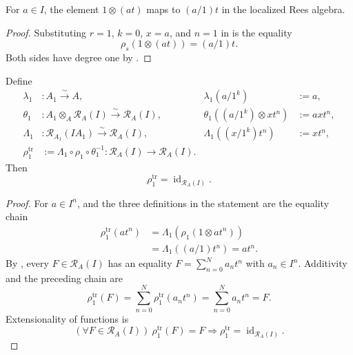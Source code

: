 \begin{lemma}
  \label{lemma:nagata-rees-localization-degree-one}

  For $a\in I$, the element $1\otimes(at)$ maps to $(a/1)t$ in the localized
  Rees algebra.
\end{lemma}

\begin{proof}
  Substituting $r=1$, $k=0$, $x=a$, and $n=1$ in
   is the equality
  \[
    \rho_s(1\otimes(at))=(a/1)t.
  \]
  Both sides have degree one by
  .
\end{proof}

\begin{lemma}
  \label{lemma:nagata-rees-localization-one}

  Define
  \[
  \begin{aligned}
    \lambda_1&\colon A_1\xrightarrow{\sim}A,
      &\lambda_1(a/1^k)&:=a,\\
    \theta_1&\colon A_1\otimes_A\mathcal R_A(I)
        \xrightarrow{\sim}\mathcal R_A(I),
      &\theta_1((a/1^k)\otimes xt^n)&:=axt^n,\\
    \Lambda_1&\colon\mathcal R_{A_1}(IA_1)
        \xrightarrow{\sim}\mathcal R_A(I),
      &\Lambda_1((x/1^k)t^n)&:=xt^n,\\
    \rho_1^{\mathrm{tr}}
      &:=\Lambda_1\circ\rho_1\circ\theta_1^{-1}
        \colon\mathcal R_A(I)\longrightarrow\mathcal R_A(I).
  \end{aligned}
  \]
  Then
  \[
    \rho_1^{\mathrm{tr}}=\operatorname{id}_{\mathcal R_A(I)}.
  \]
\end{lemma}

\begin{proof}
  For $a\in I^n$,  and the three
  definitions in the statement are the equality chain
  \[
  \begin{aligned}
    \rho_1^{\mathrm{tr}}(at^n)
      &=\Lambda_1\!\left(\rho_1(1\otimes at^n)\right)\\
      &=\Lambda_1((a/1)t^n)
       =at^n.
  \end{aligned}
  \]
  By , every $F\in\mathcal R_A(I)$
  has an equality $F=\sum_{n=0}^N a_nt^n$ with $a_n\in I^n$.  Additivity
  and the preceding chain are
  \[
    \rho_1^{\mathrm{tr}}(F)
      =\sum_{n=0}^N\rho_1^{\mathrm{tr}}(a_nt^n)
      =\sum_{n=0}^Na_nt^n
      =F.
  \]
  Extensionality of functions is
  \[
    (\forall F\in\mathcal R_A(I))\ 
      \rho_1^{\mathrm{tr}}(F)=F
      \Longrightarrow
      \rho_1^{\mathrm{tr}}=\operatorname{id}_{\mathcal R_A(I)}.
  \]
\end{proof}

